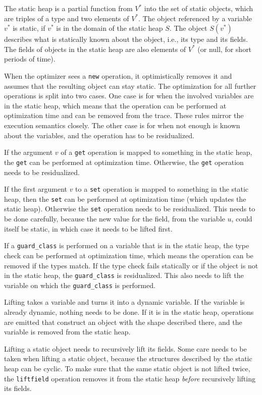 \documentclass[preprint]{sigplanconf}
\newcommand\ie{i.e.,\xspace}
\begin{document}
The static heap is a partial function from $V^*$ into the
set of static objects, which are triples of a type and two elements of $V^*$.
The object referenced by a variable $v^*$ is static, if $v^*$ is in the domain
of the static heap $S$. The object $S(v^*)$ describes
what is statically known about the object, \ie its type and its fields. The
fields of objects in the static heap are also elements of $V^*$ (or null, for
short periods of time).

When the optimizer sees a \lstinline{new} operation, it optimistically removes it and
assumes that the resulting object can stay static. The optimization for all
further operations is split into two cases. One case is for when the
involved variables are in the static heap, which means that the operation can be
performed at optimization time and can be removed from the trace. These rules mirror
the execution semantics closely. The other case is for when not enough is known about
the variables, and the operation has to be residualized.

If the argument $v$ of a \lstinline{get} operation is mapped to something in the static
heap, the \lstinline{get} can be performed at optimization time. Otherwise, the \lstinline{get}
operation needs to be residualized.

If the first argument $v$ to a \lstinline{set} operation is mapped to something in the
static heap, then the \lstinline{set} can be performed at optimization time
(which updates the static heap). Otherwise the \lstinline{set} operation needs
to be residualized. This needs to be
done carefully, because the new value for the field, from the variable $u$,
could itself be static, in which case it needs to be lifted first.

If a \lstinline{guard_class} is performed on a variable that is in the static heap, the type check
can be performed at optimization time, which means the operation can be removed
if the types match. If the type check fails statically or if the object is not
in the static heap, the \lstinline{guard_class} is residualized. This also needs to
lift the variable on which the \lstinline{guard_class} is performed.

Lifting takes a variable and turns it into a dynamic variable. If the variable
is already dynamic, nothing needs to be done. If it is in the static heap,
operations are emitted that construct an object with the shape described
there, and the variable is removed from the static heap.

Lifting a static object needs to recursively lift its fields. Some care needs to
be taken when lifting a static object, because the structures described by the
static heap can be cyclic. To make sure that the same static object is not lifted
twice, the \lstinline{liftfield} operation removes it from the static heap \emph{before}
recursively lifting its fields.
\end{document}
